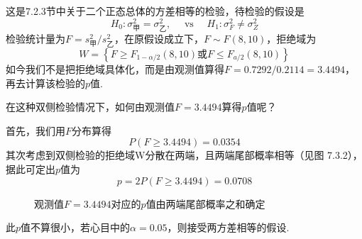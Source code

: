\begin{solution}
这是7.2.3节中关于二个正态总体的方差相等的检验，待检验的假设是
\[H _ { 0 } : \sigma _ { \text{甲} } ^ { 2 } = \sigma _ { \text{乙} } ^ { 2 } , \quad \text { vs } \quad H _ { 1 } : \sigma _ { F } ^ { 2 } \neq \sigma _ { Z } ^ { 2 }\]
检验统计量为$F = s _ { \text{甲}  } ^ { 2 } / s _ { \text{乙}  } ^ { 2 }$，在原假设成立下，$F \sim F ( 8,10 )$，拒绝域为
\[
W=\left\{F\geq F_{1-\alpha/2}\left(8,10\right)\textrm{或}F\leq F_{a/2}\left(8,10\right)\right\}
\]
如今我们不是把拒绝域具体化，而是由观测值算得$F=0.7292/0.2114=
3.4494$，再去计算该检验的$p$值.

在这种双侧检验情况下，如何由观测值$F=3.4494$算得$p$值呢？

首先，我们用$F$分布算得
\[P ( F \geq 3.4494 ) = 0.0354\]
其次考虑到双侧检验的拒绝域W分散在两端，且两端尾部概率相等（见图
7.3.2），据此可定出$p$值为
\[p = 2 P ( F \geq 3.4494 ) = 0.0708\]

\begin{figure}[htbp]
	\centering
	\caption{观测值$F=3.4494$对应的$p$值由两端尾部概率之和确定}\label{fig7.3.2}
\end{figure}

此$p$值不算很小，若心目中的$\alpha=0.05$，则接受两方差相等的假设.
\end{solution}
